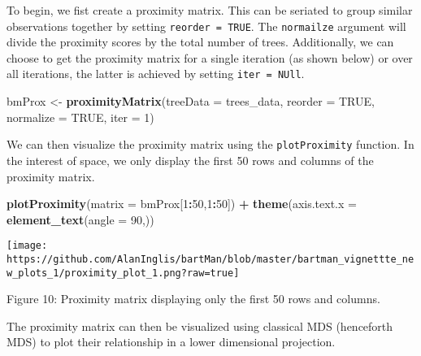 \documentclass[
]{article}
\newenvironment{Shaded}{\begin{snugshade}}{\end{snugshade}}
\newcommand{\AttributeTok}[1]{\textcolor[rgb]{0.13,0.29,0.53}{#1}}
\newcommand{\ConstantTok}[1]{\textcolor[rgb]{0.56,0.35,0.01}{#1}}
\newcommand{\DecValTok}[1]{\textcolor[rgb]{0.00,0.00,0.81}{#1}}
\newcommand{\FunctionTok}[1]{\textcolor[rgb]{0.13,0.29,0.53}{\textbf{#1}}}
\newcommand{\NormalTok}[1]{#1}
\newcommand{\OtherTok}[1]{\textcolor[rgb]{0.56,0.35,0.01}{#1}}
\newcommand{\SpecialCharTok}[1]{\textcolor[rgb]{0.81,0.36,0.00}{\textbf{#1}}}
\begin{document}
To begin, we fist create a proximity matrix. This can be seriated to
group similar observations together by setting
\texttt{reorder\ =\ TRUE}. The \texttt{normailze} argument will divide
the proximity scores by the total number of trees. Additionally, we can
choose to get the proximity matrix for a single iteration (as shown
below) or over all iterations, the latter is achieved by setting
\texttt{iter\ =\ NUll}.

\begin{Shaded}
\begin{Highlighting}[]
\NormalTok{bmProx }\OtherTok{\textless{}{-}} \FunctionTok{proximityMatrix}\NormalTok{(}\AttributeTok{treeData =}\NormalTok{ trees\_data,}
                          \AttributeTok{reorder =} \ConstantTok{TRUE}\NormalTok{,}
                          \AttributeTok{normalize =} \ConstantTok{TRUE}\NormalTok{,}
                          \AttributeTok{iter =} \DecValTok{1}\NormalTok{)}
\end{Highlighting}
\end{Shaded}

We can then visualize the proximity matrix using the
\texttt{plotProximity} function. In the interest of space, we only
display the first 50 rows and columns of the proximity matrix.

\begin{Shaded}
\begin{Highlighting}[]
\FunctionTok{plotProximity}\NormalTok{(}\AttributeTok{matrix =}\NormalTok{ bmProx[}\DecValTok{1}\SpecialCharTok{:}\DecValTok{50}\NormalTok{,}\DecValTok{1}\SpecialCharTok{:}\DecValTok{50}\NormalTok{]) }\SpecialCharTok{+}
  \FunctionTok{theme}\NormalTok{(}\AttributeTok{axis.text.x =} \FunctionTok{element\_text}\NormalTok{(}\AttributeTok{angle =} \DecValTok{90}\NormalTok{,))}
\end{Highlighting}
\end{Shaded}

\begin{center}\texttt{[image: https://github.com/AlanInglis/bartMan/blob/master/bartman\_vignettte\_new\_plots\_1/proximity\_plot\_1.png?raw=true]} \end{center}

\protect\hypertarget{fig10:fig10}{}{Figure 10: }Proximity matrix
displaying only the first 50 rows and columns.

The proximity matrix can then be visualized using classical MDS
(henceforth MDS) to plot their relationship in a lower dimensional
projection.
\end{document}
